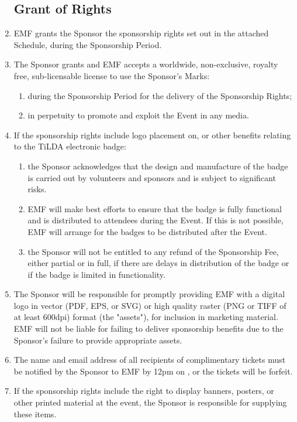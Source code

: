 \begin{enumerate}

\subsection*{Grant of Rights}

\item EMF grants the Sponsor the sponsorship rights set out in the attached Schedule,
during the Sponsorship Period.

\item The Sponsor grants and EMF accepts a worldwide, non-exclusive, royalty free,
sub-licensable license to use the Sponsor's Marks:
\begin{enumerate}
    \item during the Sponsorship Period for the delivery of the Sponsorship Rights;
    \item in perpetuity to promote and exploit the Event in any media.
\end{enumerate}

\item If the sponsorship rights include logo placement on, or other benefits relating to the TiLDA
electronic badge:
\begin{enumerate}
    \item the Sponsor acknowledges that the design and manufacture of the badge is carried out
            by volunteers and sponsors and is subject to significant risks.
    \item EMF will make best efforts to ensure that the badge is fully functional and is
            distributed to attendees during the Event. If this is not possible, EMF
            will arrange for the badges to be distributed after the Event.
    \item the Sponsor will not be entitled to any refund of the Sponsorship Fee, either partial
            or in full, if there are delays in distribution of the badge or if the badge is
            limited in functionality.
\end{enumerate}

\item The Sponsor will be responsible for promptly providing EMF with a digital logo in vector
    (PDF, EPS, or SVG) or high quality raster (PNG or TIFF of at least 600dpi) format (the "assets"),
        for inclusion in marketing material.
        EMF will not be liable for failing to deliver sponsorship benefits due to
        the Sponsor's failure to provide appropriate assets.
\item The name and email address of all recipients of complimentary tickets must be notified by the Sponsor 
        to EMF by 12pm on \sponsorticketsdeadline, or the tickets will be forfeit.
\item If the sponsorship rights include the right to display banners, posters, or other printed
        material at the event, the Sponsor is responsible for supplying these items.


\end{enumerate}
